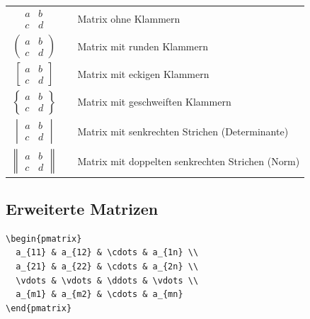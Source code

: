 \documentclass[12pt,a4paper]{article}
\begin{document}
\begin{ausgabe}
\begin{tabular}{c c l}
	\vspace{0.1cm}
	$\begin{matrix}
	  a & b \\
	  c & d
	\end{matrix}$ & & Matrix ohne Klammern\\
	\vspace{0.1cm}
	$\begin{pmatrix}
	  a & b \\
	  c & d
	\end{pmatrix}$ & & Matrix mit runden Klammern\\
	\vspace{0.1cm}
	$\begin{bmatrix}
	  a & b \\
	  c & d
	\end{bmatrix}$ & & Matrix mit eckigen Klammern\\
	\vspace{0.1cm}
	$\begin{Bmatrix}
	  a & b \\
	  c & d
	\end{Bmatrix}$ & & Matrix mit geschweiften Klammern\\
	\vspace{0.1cm}
	$\begin{vmatrix}
	  a & b \\
	  c & d
	\end{vmatrix}$ & & Matrix mit senkrechten Strichen (Determinante)\\
	$\begin{Vmatrix}
	  a & b \\
	  c & d
	\end{Vmatrix}$ & & Matrix mit doppelten senkrechten Strichen (Norm)\\
\end{tabular}
\end{ausgabe}



\subsection{Erweiterte Matrizen}

\begin{lstlisting}[style=latex]
% Grosse Matrix mit Auslassungspunkten
\begin{pmatrix}
  a_{11} & a_{12} & \cdots & a_{1n} \\
  a_{21} & a_{22} & \cdots & a_{2n} \\
  \vdots & \vdots & \ddots & \vdots \\
  a_{m1} & a_{m2} & \cdots & a_{mn}
\end{pmatrix}
\end{lstlisting}
\end{document}
